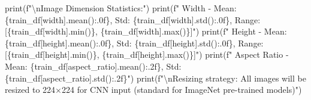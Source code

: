 \documentclass[
  letterpaper,
  DIV=11,
  numbers=noendperiod]{scrartcl}
\newenvironment{Shaded}{\begin{snugshade}}{\end{snugshade}}
\newcommand{\BuiltInTok}[1]{\textcolor[rgb]{0.00,0.23,0.31}{#1}}
\newcommand{\CharTok}[1]{\textcolor[rgb]{0.13,0.47,0.30}{#1}}
\newcommand{\NormalTok}[1]{\textcolor[rgb]{0.00,0.23,0.31}{#1}}
\newcommand{\SpecialCharTok}[1]{\textcolor[rgb]{0.37,0.37,0.37}{#1}}
\newcommand{\SpecialStringTok}[1]{\textcolor[rgb]{0.13,0.47,0.30}{#1}}
\newcommand{\StringTok}[1]{\textcolor[rgb]{0.13,0.47,0.30}{#1}}
\renewenvironment{Shaded}{%
  \begin{tcolorbox}[%
    enhanced,%
    colback=codebg,%
    colframe=codebg,%
    borderline west={3pt}{0pt}{sectionblue},%
    boxrule=0pt,%
    arc=0pt,%
    boxsep=5pt,%
    left=2mm,%
    right=2mm,%
    top=2mm,%
    bottom=2mm%
  ]%
}{%
  \end{tcolorbox}%
}
\begin{document}
\begin{Shaded}
\begin{Highlighting}[]
\BuiltInTok{print}\NormalTok{(}\SpecialStringTok{f"}\CharTok{\textbackslash{}n}\SpecialStringTok{Image Dimension Statistics:"}\NormalTok{)}
\BuiltInTok{print}\NormalTok{(}\SpecialStringTok{f"  Width  {-} Mean: }\SpecialCharTok{\{}\NormalTok{train\_df[}\StringTok{\textquotesingle{}width\textquotesingle{}}\NormalTok{]}\SpecialCharTok{.}\NormalTok{mean()}\SpecialCharTok{:.0f\}}\SpecialStringTok{, Std: }\SpecialCharTok{\{}\NormalTok{train\_df[}\StringTok{\textquotesingle{}width\textquotesingle{}}\NormalTok{]}\SpecialCharTok{.}\NormalTok{std()}\SpecialCharTok{:.0f\}}\SpecialStringTok{, Range: [}\SpecialCharTok{\{}\NormalTok{train\_df[}\StringTok{\textquotesingle{}width\textquotesingle{}}\NormalTok{]}\SpecialCharTok{.}\BuiltInTok{min}\NormalTok{()}\SpecialCharTok{\}}\SpecialStringTok{, }\SpecialCharTok{\{}\NormalTok{train\_df[}\StringTok{\textquotesingle{}width\textquotesingle{}}\NormalTok{]}\SpecialCharTok{.}\BuiltInTok{max}\NormalTok{()}\SpecialCharTok{\}}\SpecialStringTok{]"}\NormalTok{)}
\BuiltInTok{print}\NormalTok{(}\SpecialStringTok{f"  Height {-} Mean: }\SpecialCharTok{\{}\NormalTok{train\_df[}\StringTok{\textquotesingle{}height\textquotesingle{}}\NormalTok{]}\SpecialCharTok{.}\NormalTok{mean()}\SpecialCharTok{:.0f\}}\SpecialStringTok{, Std: }\SpecialCharTok{\{}\NormalTok{train\_df[}\StringTok{\textquotesingle{}height\textquotesingle{}}\NormalTok{]}\SpecialCharTok{.}\NormalTok{std()}\SpecialCharTok{:.0f\}}\SpecialStringTok{, Range: [}\SpecialCharTok{\{}\NormalTok{train\_df[}\StringTok{\textquotesingle{}height\textquotesingle{}}\NormalTok{]}\SpecialCharTok{.}\BuiltInTok{min}\NormalTok{()}\SpecialCharTok{\}}\SpecialStringTok{, }\SpecialCharTok{\{}\NormalTok{train\_df[}\StringTok{\textquotesingle{}height\textquotesingle{}}\NormalTok{]}\SpecialCharTok{.}\BuiltInTok{max}\NormalTok{()}\SpecialCharTok{\}}\SpecialStringTok{]"}\NormalTok{)}
\BuiltInTok{print}\NormalTok{(}\SpecialStringTok{f"  Aspect Ratio {-} Mean: }\SpecialCharTok{\{}\NormalTok{train\_df[}\StringTok{\textquotesingle{}aspect\_ratio\textquotesingle{}}\NormalTok{]}\SpecialCharTok{.}\NormalTok{mean()}\SpecialCharTok{:.2f\}}\SpecialStringTok{, Std: }\SpecialCharTok{\{}\NormalTok{train\_df[}\StringTok{\textquotesingle{}aspect\_ratio\textquotesingle{}}\NormalTok{]}\SpecialCharTok{.}\NormalTok{std()}\SpecialCharTok{:.2f\}}\SpecialStringTok{"}\NormalTok{)}
\BuiltInTok{print}\NormalTok{(}\SpecialStringTok{f"}\CharTok{\textbackslash{}n}\SpecialStringTok{Resizing strategy: All images will be resized to 224×224 for CNN input (standard for ImageNet pre{-}trained models)"}\NormalTok{)}
\end{Highlighting}
\end{Shaded}
\end{document}
